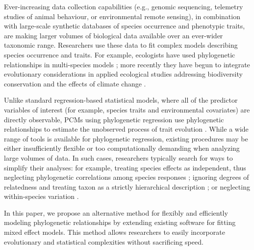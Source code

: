 \documentclass[12pt]{article}
\begin{document}
Ever-increasing data collection capabilities (e.g., genomic sequencing, telemetry studies of animal behaviour, or environmental remote sensing), in combination with large-scale synthetic databases of species occurrence and phenotypic traits, are making larger volumes of biological data available over an ever-wider taxonomic range.
Researchers use these data to fit complex models describing species occurrence and traits.
For example, ecologists have used phylogenetic relationships in multi-species models \citep{garland1992procedures, freckleton2002phylogenetic, ord2010adaptation, davies2013phylogenetic}; more recently they have begun to integrate evolutionary considerations in applied ecological studies addressing biodiversity conservation and the effects of climate change \citep{winter2013phylogenetic, santamaria2012evolution, lankau2011incorporating, lavergne2010biodiversity, mace2008evolutionary}.

Unlike standard regression-based statistical models, where all of the predictor variables of interest (for example, species traits and environmental covariates) are directly observable,  PCMs using phylogenetic regression use phylogenetic relationships to estimate the unobserved process of trait evolution \citep{felsenstein1985phylogenies, butler2004phylogenetic, hansen2012interpreting}. 
While a wide range of tools is available for phylogenetic regression, existing procedures may be either insufficiently flexible or too computationally demanding when analyzing large volumes of data.
In such cases, researchers typically search for ways to simplify their analyses: for example, treating species effects as independent, thus neglecting phylogenetic correlations among species responses \citep{bunnefeld2012island}; ignoring degrees of relatedness and treating taxon as a strictly hierarchical description \citep{tella1999habitat}; or neglecting within-species variation \citep{ord2010adaptation}.

In this paper, we propose an alternative method for flexibly and efficiently modeling phylogenetic relationships by extending existing software for fitting mixed effect models. 
This method allows researchers to easily incorporate evolutionary and statistical complexities without sacrificing speed.
\end{document}
